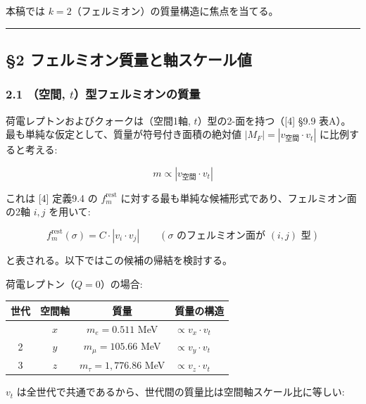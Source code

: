 \documentclass[
  a4paper,11pt]{ltjsarticle}
\newcounter{none} %
\begin{document}
本稿では \(k = 2\)（フェルミオン）の質量構造に焦点を当てる。

\begin{center}\rule{0.5\linewidth}{0.5pt}\end{center}

\subsection{§2
フェルミオン質量と軸スケール値}\label{ux30d5ux30a7ux30ebux30dfux30aaux30f3ux8ceaux91cfux3068ux8ef8ux30b9ux30b1ux30fcux30ebux5024}

\subsubsection{\texorpdfstring{2.1 （空間,
\(t\)）型フェルミオンの質量}{2.1 （空間, t）型フェルミオンの質量}}\label{ux7a7aux9593-tux578bux30d5ux30a7ux30ebux30dfux30aaux30f3ux306eux8ceaux91cf}

荷電レプトンおよびクォークは（空間1軸, \(t\)）型の2-面を持つ（{[}4{]}
§9.9 表A）。最も単純な仮定として、質量が符号付き面積の絶対値
\(|M_F| = |v_{\text{空間}} \cdot v_t|\) に比例すると考える:

\[m \propto |v_{\text{空間}} \cdot v_t|\]

これは {[}4{]} 定義9.4 の \(f_m^{\text{rest}}\)
に対する最も単純な候補形式であり、フェルミオン面の2軸 \(i, j\) を用いて:

\[f_m^{\text{rest}}(\sigma) = C \cdot |v_i \cdot v_j| \qquad (\sigma \text{ のフェルミオン面が } (i, j) \text{ 型})\]

と表される。以下ではこの候補の帰結を検討する。

荷電レプトン（\(Q = 0\)）の場合:

{\def\LTcaptype{none} %
\begin{longtable}[]{@{}cccl@{}}
\toprule\noalign{}
世代 & 空間軸 & 質量 & 質量の構造 \\
\midrule\noalign{}
\endhead
\bottomrule\noalign{}
\endlastfoot
1 & \(x\) & \(m_e = 0.511\) MeV & \(\propto v_x \cdot v_t\) \\
2 & \(y\) & \(m_\mu = 105.66\) MeV & \(\propto v_y \cdot v_t\) \\
3 & \(z\) & \(m_\tau = 1{,}776.86\) MeV & \(\propto v_z \cdot v_t\) \\
\end{longtable}
}

\(v_t\)
は全世代で共通であるから、世代間の質量比は空間軸スケール比に等しい:
\end{document}
